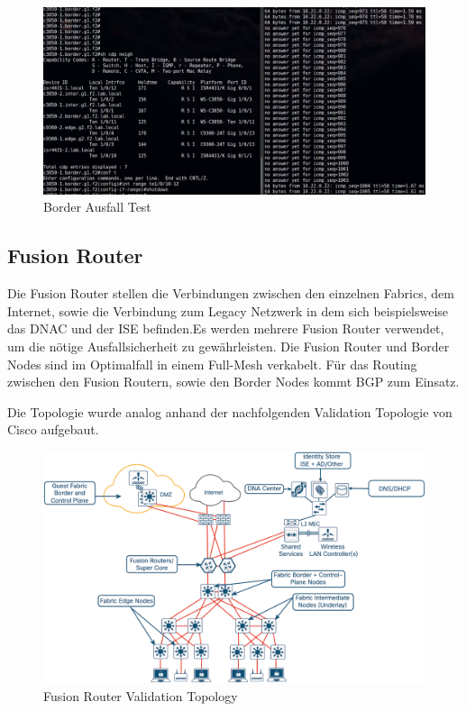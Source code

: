 \begin{figure}[H]
	\centering
	\includegraphics[width=1\linewidth]{img/Absicherung/border-ausfall-test}
	\caption{Border Ausfall Test}
	\label{fig:Border Ausfall Test}
\end{figure}

\subsection{Fusion Router}
Die Fusion Router stellen die Verbindungen zwischen den einzelnen Fabrics, dem Internet, sowie die Verbindung zum Legacy Netzwerk in dem sich beispielsweise das DNAC und der ISE befinden.Es werden mehrere Fusion Router verwendet, um die nötige Ausfallsicherheit zu gewährleisten. Die Fusion Router und Border Nodes sind im Optimalfall in einem Full-Mesh verkabelt. Für das Routing zwischen den Fusion Routern, sowie den Border Nodes kommt BGP zum Einsatz.

Die Topologie wurde analog anhand der nachfolgenden Validation Topologie von Cisco aufgebaut.
\begin{figure}[H]
	\centering
	\includegraphics[width=1\linewidth]{img/Absicherung/FusionRouter-ValidationTopology}
	\caption{Fusion Router Validation Topology \cite{sda-deploymentguide-oct2018} }
	\label{fig:Fusion Router Validation Topology}
\end{figure}

